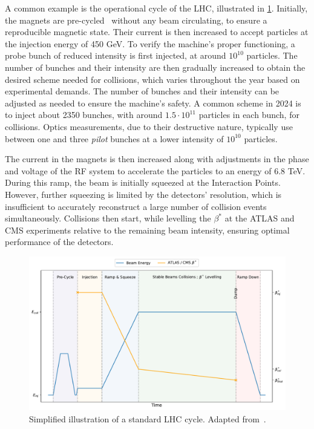 A common example is the operational cycle of the LHC, illustrated in \cref{fig:cern_complex:cycle}.
Initially, the magnets are pre-cycled~\cite{bottura_pre-cycles_2010} without any beam circulating,
to ensure a reproducible magnetic state. Their current is then increased to accept particles at the
injection energy of 450 GeV. To verify the machine's proper functioning, a probe bunch of reduced
intensity is first injected, at around $10^{10}$ particles. The number of bunches and their
intensity are then gradually increased to obtain the desired scheme needed for collisions, which
varies throughout the year based on experimental demands. The number of bunches and their intensity
can be adjusted as needed to ensure the machine's safety. A common scheme in 2024 is to inject about
2350 bunches, with around $1.5 \cdot 10^{11}$ particles in each bunch, for collisions. Optics
measurements, due to their destructive nature, typically use between one and three \textit{pilot}
bunches at a lower intensity of $10^{10}$ particles.

The current in the magnets is then increased along with adjustments in the phase and voltage of the
RF system to accelerate the particles to an energy of 6.8 TeV. During this ramp, the beam is
initially squeezed at the Interaction Points. However, further squeezing is limited by the
detectors' resolution, which is insufficient to accurately reconstruct a large number of collision
events simultaneously. Collisions then start, while levelling the $\beta^*$ at the ATLAS and CMS
experiments relative to the remaining beam intensity, ensuring optimal performance of the detectors.

\begin{figure}[!htb]
    \includegraphics[width=\textwidth]{./images/lhc_cycle.pdf}
    \caption{Simplified illustration of a standard LHC cycle. Adapted
    from~\cite{felix_soubelet_local_2023}.}
    \label{fig:cern_complex:cycle}
\end{figure}
